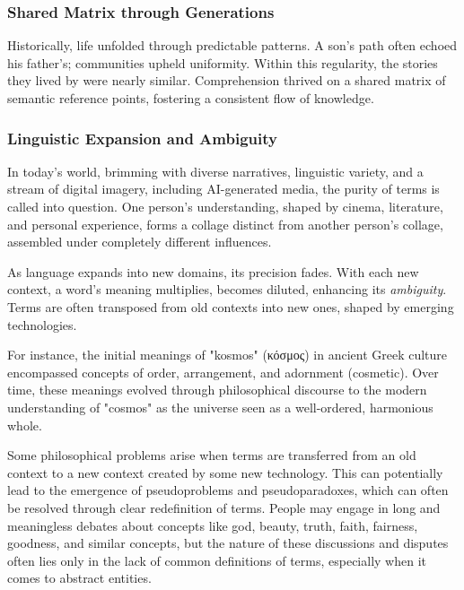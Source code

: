 \documentclass[11pt,a4]{article}
\newcommand{\textgreek}[1]{\begingroup\fontencoding{LGR}\selectfont#1\endgroup}
\begin{document}
        \subsubsection{Shared Matrix through Generations}
            \par
            Historically, life unfolded through predictable patterns. A son's path often echoed his father's;
            communities upheld uniformity. Within this regularity, the stories they lived by were nearly similar.
            Comprehension thrived on a shared matrix of semantic reference points, fostering a
            consistent flow of knowledge.

        \subsubsection{Linguistic Expansion and Ambiguity}

            In today's world, brimming with diverse narratives, linguistic variety, and a stream of digital imagery,
            including AI-generated media, the purity of terms is called into question. One person's understanding,
            shaped by cinema, literature, and personal experience, forms a collage distinct from another
            person's collage, assembled under completely different influences.

            As language expands into new domains, its precision fades. With each new context, a word's meaning
            multiplies, becomes diluted, enhancing its \textit{ambiguity}. Terms are often transposed from old
            contexts into new ones, shaped by emerging technologies.

            For instance,  the initial meanings of "kosmos" (\textgreek{κόσμος}) in ancient Greek culture
            encompassed concepts of order, arrangement, and adornment (cosmetic). Over time, these meanings
            evolved through philosophical discourse to the modern understanding of "cosmos" as the universe
            seen as a well-ordered, harmonious whole.


             Some philosophical problems arise when terms are transferred from an old context to a new context
             created by some new technology. This can potentially lead to the emergence of pseudoproblems and
             pseudoparadoxes, which can often be resolved through clear redefinition of terms. People may
             engage in long and meaningless debates about concepts like god, beauty, truth, faith, fairness,
             goodness, and similar concepts, but the nature of these discussions and disputes often lies
             only in the lack of common definitions of terms, especially when it comes to abstract entities.
\end{document}
